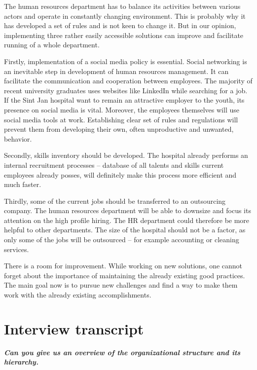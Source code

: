 \documentclass[a4paper,fleqn,11pt,dvips,titlepage]{article}
\newcommand{\question}[1]{\textbf{\textit{#1}}}
\numberwithin{figure}{section}
\numberwithin{equation}{section}
\begin{document}
The human resources department has to balance its activities between various actors and operate in constantly changing environment. This is probably why it has developed a set of rules and is not keen to change it. But in our opinion, implementing three rather easily accessible solutions can improve and facilitate running of a whole department. 

Firstly, implementation of a social media policy is essential. Social networking is an inevitable step in development of human resources management. It can facilitate the communication and cooperation between employees. The majority of recent university graduates uses websites like LinkedIn while searching for a job. If the Sint Jan hospital want to remain an attractive employer to the youth, its presence on social media is vital. Moreover, the employees themselves will use social media tools at work. Establishing clear set of rules and regulations will prevent them from developing their own, often unproductive and unwanted, behavior. 

Secondly, skills inventory should be developed. The hospital already performs an internal recruitment processes – database of all talents and skills current employees already posses, will definitely make this process more efficient and much faster. 

Thirdly, some of the current jobs should be transferred to an outsourcing company. The human resources department will be able to downsize and focus its attention on the high profile hiring. The HR department could therefore be more helpful to other departments. The size of the hospital should not be a factor, as only some of the jobs will be outsourced – for example accounting or cleaning services. 

There is a room for improvement. While working on new solutions, one cannot forget about the importance of maintaining the already existing good practices. The main goal now is to pursue new challenges and find a way to make them work with the already existing accomplishments. 

\newpage
{}



\newpage
\appendix

\section{Interview transcript}


\question{Can you give us an overview of the organizational structure and its hierarchy.}
\end{document}
